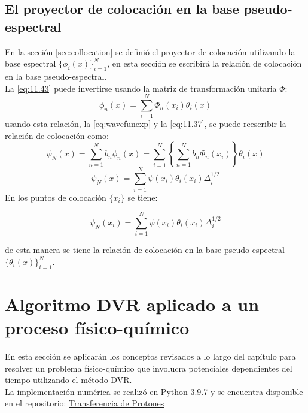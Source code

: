 \subsection{El proyector de colocación en la base pseudo-espectral}
En la sección \autoref{sec:collocation} se definió el proyector de colocación utilizando la base espectral $\{ \phi_i(x)\}_{i=1}^{N}$, en esta sección se escribirá la relación de colocación en la base pseudo-espectral.
\\

La \autoref{eq:11.43} puede invertirse usando la matriz de transformación unitaria $\Phi$:
\begin{equation}
  \label{eq:11.51}
  \phi_n(x) = \sum_{i=1}^{N}\Phi_n(x_i)\theta_i(x)
\end{equation}
usando esta relación, la \autoref{eq:wavefunexp} y la \autoref{eq:11.37}, se puede reescribir la relación de colocación como:
\begin{equation}
  \label{eq:11.53}
  \psi_N(x) = \sum_{n=1}^N b_n\phi_n(x) = \sum_{i=1}^N \left \{ \sum_{n=1}^Nb_n\Phi_n(x_i)\right\} \theta_i(x)
\end{equation}
\begin{equation}
  \label{eq:11.54}
  \psi_N(x) = \sum_{i=1}^N \psi(x_i)\theta_i(x_i)\Delta_i^{1/2}
\end{equation}
En los puntos de colocación $\{x_i\}$ se tiene:

\begin{equation}
  \label{eq:11.55}
  \psi_N(x_i) = \sum_{i=1}^N \psi(x_i)\theta_i(x_i)\Delta_i^{1/2}
\end{equation}

de esta manera se tiene la relación de colocación en la base pseudo-espectral $\{ \theta_i(x)\}_{i=1}^N$.

\section{Algoritmo DVR aplicado a un proceso físico-químico}\label{sec:DVRapp}

En esta sección se aplicarán los conceptos revisados a lo largo del capítulo para resolver un problema físico-químico que involucra potenciales dependientes del tiempo utilizando el método \acs{DVR}.\\
La implementación numérica se realizó en Python 3.9.7 y se encuentra disponible en el repositorio: \href{https://github.com/Jessi-MM/PropagatorLearning/blob/main/src/ANN_as_Propagators_DidacticNotebook.ipynb}{\faGithub Transferencia de Protones}

